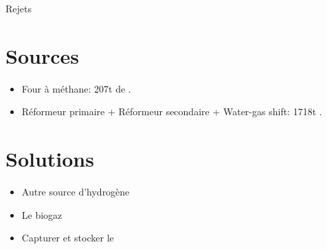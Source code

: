 \documentclass{beamer}
\begin{document}
\begin{frame}{Rejets }
\begin{center}
\part*{Sources}
\begin{itemize}
\item Four à méthane: \unit{207}{t} de .
\item Réformeur primaire + Réformeur secondaire + Water-gas shift: \unit{1718}{t} .
\end{itemize}
\part*{Solutions}
\begin{itemize}
\item Autre source d'hydrogène
\item Le biogaz
\item Capturer et stocker le 
\end{itemize}
\end{center}
\end{frame}
\end{document}
